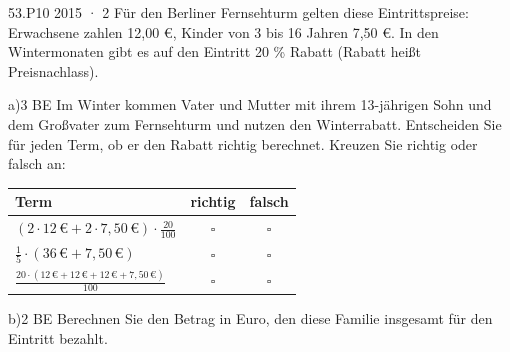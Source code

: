 \documentclass[11pt]{article}
\begin{document}
\begin{pfaufgabe}{53.}{P10 2015 · 2}
Für den Berliner Fernsehturm gelten diese Eintrittspreise: Erwachsene zahlen 12,00 €, Kinder von 3 bis 16 Jahren 7,50 €. In den Wintermonaten gibt es auf den Eintritt 20 \% Rabatt (Rabatt heißt Preisnachlass).
\end{pfaufgabe}
\begin{pfaufgabe}{a)}{3 BE}
Im Winter kommen Vater und Mutter mit ihrem 13-jährigen Sohn und dem Großvater zum Fernsehturm und nutzen den Winterrabatt. Entscheiden Sie für jeden Term, ob er den Rabatt richtig berechnet. Kreuzen Sie richtig oder falsch an:
\par\smallskip\noindent \begingroup\renewcommand{\arraystretch}{1.5}\begin{tabular}{|l|c|c|}\hline Term & richtig & falsch\\ \hline $(2\cdot 12\,€ + 2\cdot 7{,}50\,€)\cdot\tfrac{20}{100}$ & $\square$ & $\square$ \\ $\tfrac{1}{5}\cdot(36\,€ + 7{,}50\,€)$ & $\square$ & $\square$ \\ $\tfrac{20\cdot(12\,€ + 12\,€ + 12\,€ + 7{,}50\,€)}{100}$ & $\square$ & $\square$ \\ \hline\end{tabular}\endgroup\par
{}
\end{pfaufgabe}
\begin{pfaufgabe}{b)}{2 BE}
Berechnen Sie den Betrag in Euro, den diese Familie insgesamt für den Eintritt bezahlt.
\end{pfaufgabe}
\end{document}
